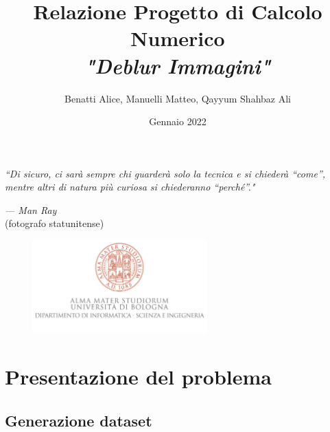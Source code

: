 \documentclass{article}
\title{\textbf{Relazione Progetto di Calcolo Numerico} \\ \textit{"Deblur Immagini"}}
\author{Benatti Alice, Manuelli Matteo, Qayyum Shahbaz Ali}
\date{Gennaio 2022}
\begin{document}
\maketitle
\addvspace{5cm}
\epigraph{
    \textit{ 
    ``Di sicuro, ci sarà sempre chi guarderà solo la tecnica e si chiederà “come”, 
    mentre altri di natura più curiosa si chiederanno “perché”."}}{\textit{
    --- Man Ray}\\(fotografo statunitense)}
\begin{figure}[b]
    \centering
    \includegraphics[width=0.6\textwidth]{imgRel/alma-logo.jpg}
\end{figure}
\newpage

\tableofcontents
\newpage

\section{Presentazione del problema}

    \subsection{Generazione dataset}
    
    
    

    
    \newpage
    
\newpage

    \newpage
    
\newpage


\end{document}

